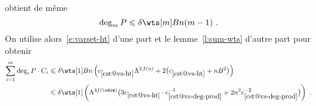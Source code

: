 obtient de même
\begin{equation}
  \deg_\puiss P
  \le
  \delta \wts[\puiss] B\dimp (\puiss - 1)
  \pmm.
\end{equation}
On utilise alors~\eqref{e:varset-ht} d'une part et le lemme~\ref{l:sum-wts}
d'autre part pour obtenir
\begin{align}
  \sum\fctrange \deg_\fct P \cdot C_\fct
  & \le
  \delta \wts[1] B\dimp
  \left(
    \cst{vs-ht} \Lambda^{2\,f(u)}
    + 2 \bigl(
      \cst{vs-ht} + \dimp B^2
    \bigr)
  \right)
  \\ & \le \label{e:apx-1a-sum}
  \delta \wts[1] \left(
    \Lambda^{3f(\vdim)} \bigl(
      3 \cst{vs-ht} \cdot \cst{vs-deg-prod}^{-1}
      + 2\dimp^2 \cst{vs-deg-prod}^{-2}
    \bigr)
  \right)
  \pmm.
\end{align}

